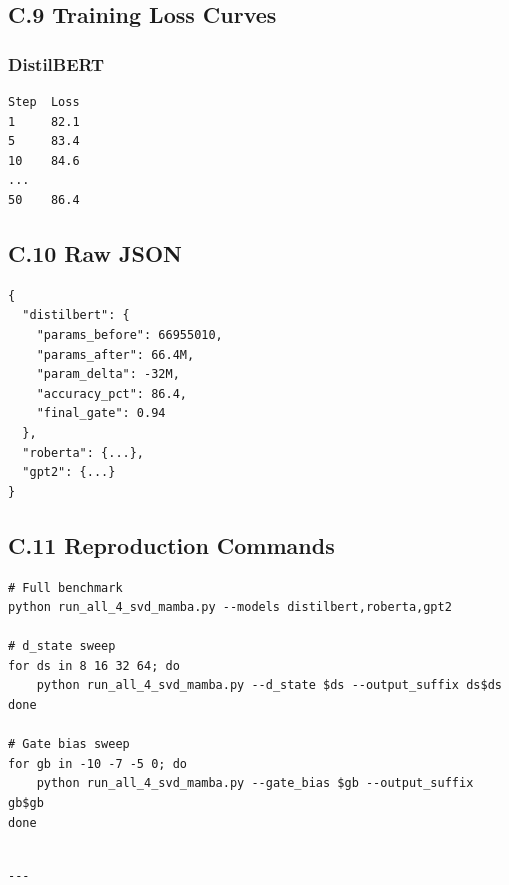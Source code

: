 \subsection{C.9 Training Loss Curves}

\subsubsection{DistilBERT}
\begin{lstlisting}
Step  Loss
1     82.1
5     83.4
10    84.6
...
50    86.4
\end{lstlisting}

\subsection{C.10 Raw JSON}

\begin{lstlisting}
{
  "distilbert": {
    "params_before": 66955010,
    "params_after": 66.4M,
    "param_delta": -32M,
    "accuracy_pct": 86.4,
    "final_gate": 0.94
  },
  "roberta": {...},
  "gpt2": {...}
}
\end{lstlisting}

\subsection{C.11 Reproduction Commands}

\begin{lstlisting}
# Full benchmark
python run_all_4_svd_mamba.py --models distilbert,roberta,gpt2

# d_state sweep
for ds in 8 16 32 64; do
    python run_all_4_svd_mamba.py --d_state $ds --output_suffix ds$ds
done

# Gate bias sweep
for gb in -10 -7 -5 0; do
    python run_all_4_svd_mamba.py --gate_bias $gb --output_suffix gb$gb
done
\end{lstlisting}
\begin{lstlisting}

---
\end{lstlisting}